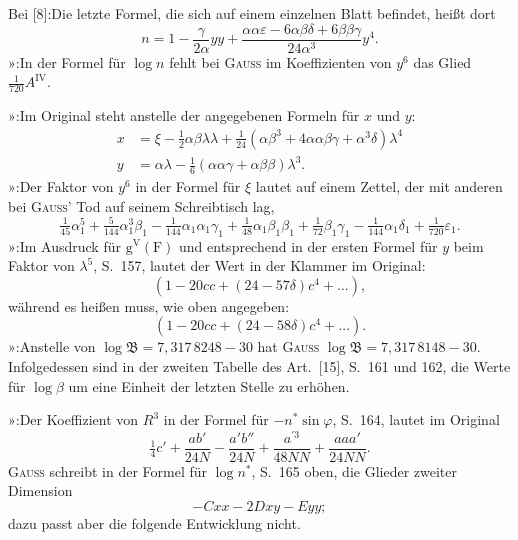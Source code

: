 {\small
\noindent Bei [8]:\quad Die letzte Formel, die sich auf einem einzelnen Blatt befindet, heißt dort
\[
n=1-\frac{\gamma}{2\alpha}yy+
\frac{\alpha\alpha\varepsilon-6\alpha\beta\delta+6\beta\beta\gamma}{24\alpha^3}y^4.
\]
\noindent »\quad [9]:\quad In der Formel für \(\log n\) fehlt bei \textsc{Gauss} im Koeffizienten von \(y^6\) das Glied \(\tfrac1{720}A^{\mathrm{IV}}\).

\noindent »\quad [11]:\quad Im Original steht anstelle der angegebenen Formeln für \(x\) und \(y\):
\[
\begin{aligned}
x&=\xi-\tfrac12\alpha\beta\lambda\lambda
+\tfrac1{24}(\alpha\beta^3+4\alpha\alpha\beta\gamma+\alpha^3\delta)\lambda^4\\
y&=\alpha\lambda-\tfrac16(\alpha\alpha\gamma+\alpha\beta\beta)\lambda^3.
\end{aligned}
\]
\noindent »\quad [12]:\quad Der Faktor von \(y^6\) in der Formel für \(\xi\) lautet auf einem Zettel, der mit anderen bei \textsc{Gauss}' Tod auf seinem Schreibtisch lag,
\[
\tfrac1{45}\alpha_1^5+\tfrac5{144}\alpha_1^3\beta_1
-\tfrac1{144}\alpha_1\alpha_1\gamma_1+\tfrac1{48}\alpha_1\beta_1\beta_1
+\tfrac1{72}\beta_1\gamma_1-\tfrac1{144}\alpha_1\delta_1+\tfrac1{720}\varepsilon_1.
\]
\noindent »\quad [13]:\quad Im Ausdruck für \(\mathrm g^{\mathrm V}(\mathrm F)\)
und entsprechend in der ersten Formel für \(y\) beim Faktor von \(\lambda^5\),
S.\ 157, lautet der Wert in der Klammer im Original:
\[
(1-20cc+(24-57\delta)c^4+\ldots),
\]
\noindent während es heißen muss, wie oben angegeben:
\[
(1-20cc+(24-58\delta)c^4+\ldots).
\]
\noindent »\quad [15]:\quad Anstelle von \(\log\mathfrak{B}=7{,}317\,8248-30\) hat
\textsc{Gauss} \(\log\mathfrak{B}=7{,}317\,8148-30\). Infolgedessen sind in der
zweiten Tabelle des Art.\ [15], S.\ 161 und 162, die Werte für \(\log\beta\) um
eine Einheit der letzten Stelle zu erhöhen.

\noindent »\quad [16]:\quad Der Koeffizient von \(R^3\) in der Formel für \(-n^*\sin\varphi\),
S.\ 164, lautet im Original
\[
\tfrac14c'+\frac{ab'}{24N}-\frac{a'b''}{24N}
+\frac{a^{\prime3}}{48NN}+\frac{aaa'}{24NN}.
\]
\noindent \textsc{Gauss} schreibt in der Formel für \(\log n^*\), S.\ 165 oben,
die Glieder zweiter Dimension
\[
-Cxx-2Dxy-Eyy;
\]
\noindent dazu passt aber die folgende Entwicklung nicht.

}
